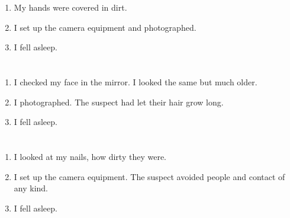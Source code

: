 \documentclass{article}
\begin{document}
    \newpage
    
    \section{}
    
    \begin{enumerate}
    
    \item My hands were covered in dirt.\\
    
    \item I set up the camera equipment and photographed.\\
    
    \item I fell asleep.\\
    
    \end{enumerate}
     
    \newpage
    
    \section{}
    
    \begin{enumerate}
    
    \item I checked my face in the mirror. I looked the same but much older.\\
    
    \item I photographed. The suspect had let their hair grow long.\\
    
    \item I fell asleep.\\
    
    \end{enumerate}
     
    \newpage
    
    \section{}
    
    \begin{enumerate}
    
    \item I looked at my nails, how dirty they were.\\
    
    \item I set up the camera equipment. The suspect avoided people and contact of any kind.\\
    
    \item I fell asleep.\\
    
    \end{enumerate}
     
\end{document}
